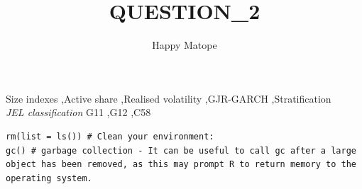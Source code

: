 \documentclass[11pt,preprint]{elsarticle}
\numberwithin{equation}{section}
\numberwithin{figure}{section}
\numberwithin{table}{section}
\begin{document}
\begin{frontmatter}  %

\title{QUESTION\_2}





\author[Add1]{Happy Matope}





\address[Add1]{Stellenbosch University, South Africa}



\vspace{1cm}


\begin{keyword}
\footnotesize{
Size indexes \sep Active share \sep Realised volatility \sep GJR-GARCH
\sep Stratification \\
\vspace{0.3cm}
}
\footnotesize{
\textit{JEL classification} G11 \sep G12 \sep C58
}
\end{keyword}



\vspace{0.5cm}

\end{frontmatter}

\setcounter{footnote}{0}



\pagestyle{fancy}
\chead{}
\lfoot{}
\lhead{}
\cfoot{}


\headsep 35pt %




\makeatletter
{}
\makeatother

\begin{verbatim}
rm(list = ls()) # Clean your environment:
gc() # garbage collection - It can be useful to call gc after a large object has been removed, as this may prompt R to return memory to the operating system.
\end{verbatim}
\end{document}
